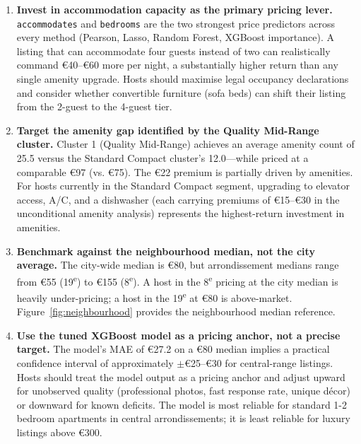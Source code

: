 \documentclass[12pt, a4paper]{article}
\begin{document}
\begin{enumerate}[leftmargin=2em, itemsep=8pt]

  \item \textbf{Invest in accommodation capacity as the primary pricing lever.}
  \texttt{accommodates} and \texttt{bedrooms} are the two strongest price predictors across every method (Pearson, Lasso, Random Forest, XGBoost importance). A listing that can accommodate four guests instead of two can realistically command \euro{}40--\euro{}60 more per night, a substantially higher return than any single amenity upgrade. Hosts should maximise legal occupancy declarations and consider whether convertible furniture (sofa beds) can shift their listing from the 2-guest to the 4-guest tier.

  \item \textbf{Target the amenity gap identified by the Quality Mid-Range cluster.}
  Cluster 1 (Quality Mid-Range) achieves an average amenity count of 25.5 versus the Standard Compact cluster's 12.0---while priced at a comparable \euro{}97 (vs. \euro{}75). The \euro{}22 premium is partially driven by amenities. For hosts currently in the Standard Compact segment, upgrading to elevator access, A/C, and a dishwasher (each carrying premiums of \euro{}15--\euro{}30 in the unconditional amenity analysis) represents the highest-return investment in amenities.

  \item \textbf{Benchmark against the neighbourhood median, not the city average.}
  The city-wide median is \euro{}80, but arrondissement medians range from \euro{}55 (19\textsuperscript{e}) to \euro{}155 (8\textsuperscript{e}). A host in the 8\textsuperscript{e} pricing at the city median is heavily under-pricing; a host in the 19\textsuperscript{e} at \euro{}80 is above-market. Figure~\ref{fig:neighbourhood} provides the neighbourhood median reference.

  \item \textbf{Use the tuned XGBoost model as a pricing anchor, not a precise target.}
  The model's MAE of \euro{}27.2 on a \euro{}80 median implies a practical confidence interval of approximately $\pm$\euro{}25--\euro{}30 for central-range listings. Hosts should treat the model output as a pricing anchor and adjust upward for unobserved quality (professional photos, fast response rate, unique décor) or downward for known deficits. The model is most reliable for standard 1-2 bedroom apartments in central arrondissements; it is least reliable for luxury listings above \euro{}300.


\end{enumerate}
\end{document}
